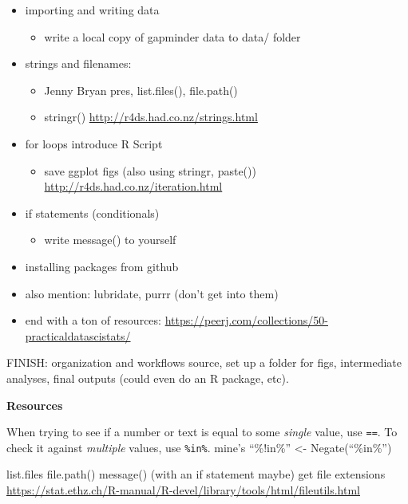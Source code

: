 \documentclass[]{book}
\providecommand{\tightlist}{%
  \setlength{\itemsep}{0pt}\setlength{\parskip}{0pt}}
\theoremstyle{definition}
\theoremstyle{definition}
\theoremstyle{definition}
\theoremstyle{remark}
\begin{document}
\begin{itemize}
\item
  importing and writing data

  \begin{itemize}
  \tightlist
  \item
    write a local copy of gapminder data to data/ folder
  \end{itemize}
\item
  strings and filenames:

  \begin{itemize}
  \tightlist
  \item
    Jenny Bryan pres, list.files(), file.path()
  \item
    stringr() \url{http://r4ds.had.co.nz/strings.html}
  \end{itemize}
\item
  for loops introduce R Script

  \begin{itemize}
  \tightlist
  \item
    save ggplot figs (also using stringr, paste())
    \url{http://r4ds.had.co.nz/iteration.html}
  \end{itemize}
\item
  if statements (conditionals)

  \begin{itemize}
  \tightlist
  \item
    write message() to yourself
  \end{itemize}
\item
  installing packages from github
\item
  also mention: lubridate, purrr (don't get into them)
\item
  end with a ton of resources:
  \url{https://peerj.com/collections/50-practicaldatascistats/}
\end{itemize}

FINISH: organization and workflows source, set up a folder for figs,
intermediate analyses, final outputs (could even do an R package, etc).

\textbf{Resources}

When trying to see if a number or text is equal to some \emph{single}
value, use \texttt{==}. To check it against \emph{multiple} values, use
\texttt{\%in\%}. mine's ``\%!in\%'' \textless{}- Negate(``\%in\%'')

list.files file.path() message() (with an if statement maybe) get file
extensions
\url{https://stat.ethz.ch/R-manual/R-devel/library/tools/html/fileutils.html}
\end{document}
